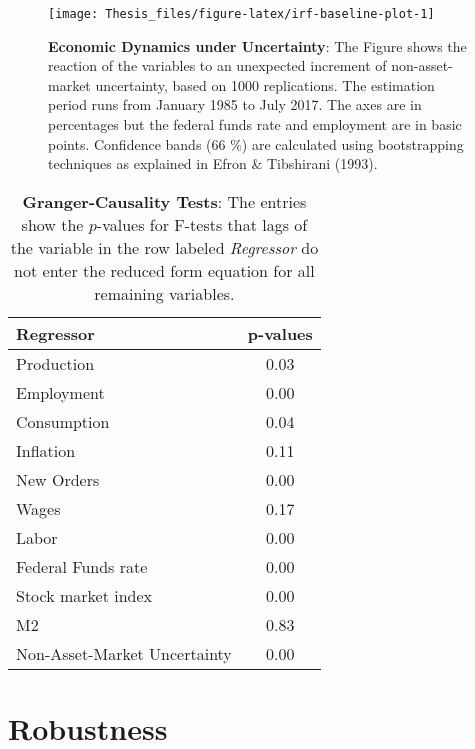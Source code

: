 \documentclass[12pt,twoside]{reedthesis}
\begin{document}
\begin{figure}

{\centering \texttt{[image: Thesis\_files/figure-latex/irf-baseline-plot-1]} 

}

\caption[Economic Dynamics under Uncertainty]{\textbf{Economic Dynamics under Uncertainty}: The Figure shows the reaction of the variables to an unexpected increment of non-asset-market uncertainty, based on 1000 replications. The estimation period runs from January 1985 to July 2017. The axes are in percentages but the federal funds rate and employment are in basic points. Confidence bands (66 \%) are calculated using bootstrapping techniques as explained in Efron \& Tibshirani (1993).}\label{fig:irf-baseline-plot}
\end{figure}

\begin{table}

\caption[Granger-Causality Tests]{\label{tab:Granger-table}\textbf{Granger-Causality Tests}: The entries show the \(p\)-values for F-tests that lags of the variable in the row labeled \emph{Regressor} do not enter the reduced form equation for all remaining variables.}
\centering
\begin{tabular}[t]{lc}
\toprule
Regressor & p-values\\
\midrule
Production & 0.03\\
Employment & 0.00\\
Consumption & 0.04\\
Inflation & 0.11\\
New Orders & 0.00\\
Wages & 0.17\\
Labor & 0.00\\
Federal Funds rate & 0.00\\
Stock market index & 0.00\\
M2 & 0.83\\
Non-Asset-Market Uncertainty & 0.00\\
\bottomrule
\end{tabular}
\end{table}
\hypertarget{robustness}{%
\section{Robustness}\label{robustness}}
\end{document}
